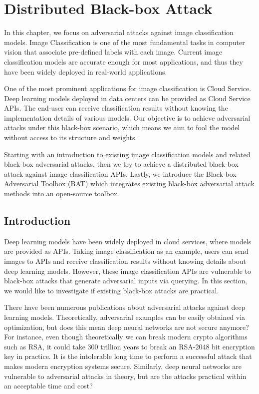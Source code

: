 \chapter{Distributed Black-box Attack}
\label{chpt:classification}


In this chapter, we focus on adversarial attacks against image classification models. Image Classification is one of the most fundamental tasks in computer vision that associate pre-defined labels with each image. Current image classification models are accurate enough for most applications, and thus they have been widely deployed in real-world applications.

One of the most prominent applications for image classification is Cloud Service. Deep learning models deployed in data centers can be provided as Cloud Service APIs. The end-user can receive classification results without knowing the implementation details of various models. Our objective is to achieve adversarial attacks under this black-box scenario, which means we aim to fool the model without access to its structure and weights.

Starting with an introduction to existing image classification models and related black-box adversarial attacks, then we try to achieve a distributed black-box attack against image classification APIs. Lastly, we introduce the Black-box Adversarial Toolbox (BAT) which integrates existing black-box adversarial attack methods into an open-source toolbox.

\section{Introduction}

{D}{eep} learning models have been widely deployed in cloud services, where models are provided as APIs. Taking image classification as an example, users can send images to APIs and receive classification results without knowing details about deep learning models. However, these image classification APIs are vulnerable to black-box attacks that generate adversarial inputs via querying. In this section, we would like to investigate if existing black-box attacks are practical.

There have been numerous publications about adversarial attacks against deep learning models. Theoretically, adversarial examples can be easily obtained via optimization, but does this mean deep neural networks are not secure anymore? For instance, even though theoretically we can break modern crypto algorithms such as RSA, it could take 300 trillion years to break an RSA-2048 bit encryption key in practice. It is the intolerable long time to perform a successful attack that makes modern encryption systems secure. Similarly, deep neural networks are vulnerable to adversarial attacks in theory, but are the attacks practical within an acceptable time and cost?

